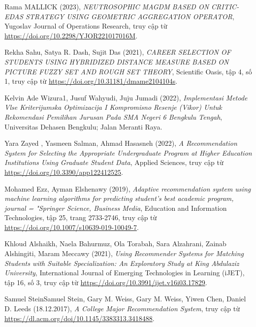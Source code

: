 \begin{thebibliography}{99}
    Rama MALLICK (2023),
    \emph{NEUTROSOPHIC MAGDM BASED ON CRITIC-EDAS STRATEGY USING GEOMETRIC AGGREGATION OPERATOR},
    Yugoslav Journal of Operations Research,
    truy cập từ \href{https://doi.org/10.2298/YJOR221017016M}{\color{black}https://doi.org/10.2298/YJOR221017016M}.

    Rekha Sahu, Satya R. Dash, Sujit Das (2021),
    \emph{CAREER SELECTION OF STUDENTS USING HYBRIDIZED DISTANCE MEASURE BASED ON PICTURE FUZZY SET AND ROUGH SET THEORY},
    Scientific Oasis,
    tập 4, số 1,
    truy cập từ \href{https://doi.org/10.31181/dmame2104104s}{\color{black}https://doi.org/10.31181/dmame2104104s}.

    Kelvin Ade Wizura1, Jusuf Wahyudi, Juju Jumadi (2022),
    \emph{Implementasi Metode Vlse Kriterijumska Optimizacija I Kompromisno Resenje (Vikor) Untuk Rekomendasi Pemilihan Jurusan Pada SMA Negeri 6 Bengkulu Tengah},
    Universitas Dehasen Bengkulu; Jalan Meranti Raya.

    Yara Zayed , Yasmeen Salman, Ahmad Hasasneh (2022),
    \emph{A Recommendation System for Selecting the Appropriate Undergraduate Program at Higher Education Institutions Using Graduate Student Data},
    Applied Sciences,
    truy cập từ \href{https://doi.org/10.3390/app122412525}{\color{black}https://doi.org/10.3390/app122412525}.

    Mohamed Ezz, Ayman Elshenawy (2019),
    \emph{Adaptive recommendation system using machine learning algorithms for predicting student’s best academic program,
    journal = "Springer Science, Business Media},
    Education and Information Technologies,
    tập 25, trang 2733-2746,
    truy cập từ \href{https://doi.org/10.1007/s10639-019-10049-7}{\color{black}https://doi.org/10.1007/s10639-019-10049-7}.

    Khloud Alshaikh, Naela Bahurmuz, Ola Torabah, Sara Alzahrani, Zainab Alshingiti, Maram Meccawy (2021),
    \emph{Using Recommender Systems for Matching Students with Suitable Specialization: An Exploratory Study at King Abdulaziz University},
    International Journal of Emerging Technologies in Learning (iJET),
    tập 16, số 3,
    truy cập từ \href{https://doi.org/10.3991/ijet.v16i03.17829}{\color{black}https://doi.org/10.3991/ijet.v16i03.17829}.

    Samuel SteinSamuel Stein, Gary M. Weiss, Gary M. Weiss, Yiwen Chen, Daniel D. Leeds (18.12.2017),
    \emph{A College Major Recommendation System},
    truy cập từ \href{https://dl.acm.org/doi/10.1145/3383313.3418488}{\color{black}https://dl.acm.org/doi/10.1145/3383313.3418488}.


\end{thebibliography}
